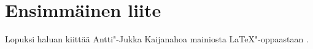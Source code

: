 \chapter{Ensimmäinen liite}

Lopuksi haluan kiittää Antti"-Jukka Kaijanahoa mainiosta \LaTeX"-oppaastaan \citep{Kaijanaho1998Opus-asiatekstin-ladonnasta}.